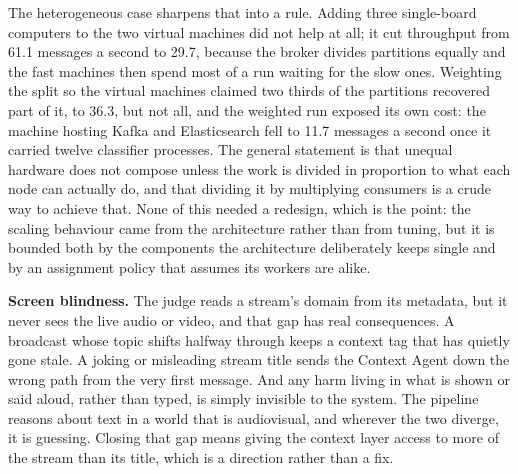 The heterogeneous case sharpens that into a rule. Adding three single-board computers to the two virtual machines did not help at all; it cut throughput from 61.1 messages a second to 29.7, because the broker divides partitions equally and the fast machines then spend most of a run waiting for the slow ones. Weighting the split so the virtual machines claimed two thirds of the partitions recovered part of it, to 36.3, but not all, and the weighted run exposed its own cost: the machine hosting Kafka and Elasticsearch fell to 11.7 messages a second once it carried twelve classifier processes. The general statement is that unequal hardware does not compose unless the work is divided in proportion to what each node can actually do, and that dividing it by multiplying consumers is a crude way to achieve that. None of this needed a redesign, which is the point: the scaling behaviour came from the architecture rather than from tuning, but it is bounded both by the components the architecture deliberately keeps single and by an assignment policy that assumes its workers are alike.

\textbf{Screen blindness.} The judge reads a stream's domain from its metadata, but it never sees the live audio or video, and that gap has real consequences. A broadcast whose topic shifts halfway through keeps a context tag that has quietly gone stale. A joking or misleading stream title sends the Context Agent down the wrong path from the very first message. And any harm living in what is shown or said aloud, rather than typed, is simply invisible to the system. The pipeline reasons about text in a world that is audiovisual, and wherever the two diverge, it is guessing. Closing that gap means giving the context layer access to more of the stream than its title, which is a direction rather than a fix.
